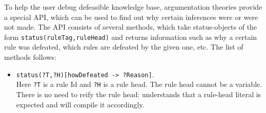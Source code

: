 \documentclass[11pt]{article}
\newcommand{\ERGO}{\mbox{\smaller{\ensuremath{\cal{E}}\smaller{{\sc{RGO}}}}}\xspace}
\newcommand{\FLSYSTEM}{\ERGO}
\begin{document}
To help the user debug defeasible knowledge base, argumentation
theories provide a special API, which can be used to find out
why certain inferences were or were not made.
The API consists of several methods, which take status-objects of the form
{\tt status(ruleTag,ruleHead)} and returns information such as why a certain
rule was defeated, which rules are defeated by the given one, etc.
The list of methods follows:
\begin{itemize}
\item  {\tt status(?T,?H)[howDefeated -> ?Reason]}.\\
  Here {\tt ?T} is a rule Id and {\tt ?H} is a rule head. The rule head
  cannot be a variable. There is no need to reify the rule head: \FLSYSTEM
  understands that a rule-head literal is expected and will compile it
  accordingly.  


\end{itemize}
\end{document}
